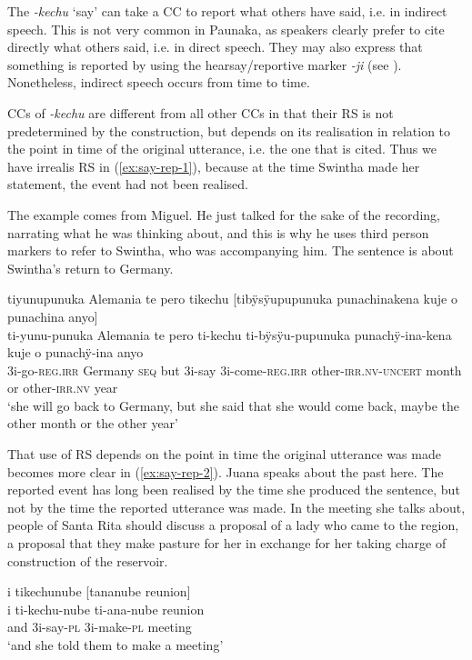 The  \textit{-kechu} ‘say’ can take a CC to report what others have said, i.e. in indirect speech. This is not very common in Paunaka, as speakers clearly prefer to cite directly what others said, i.e. in direct speech. They may also express that something is reported by using the hearsay/reportive marker \textit{-ji} (see ). Nonetheless, indirect speech occurs from time to time. 

CCs of \textit{-kechu} are different from all other CCs in that their RS is not predetermined by the construction, but depends on its realisation in relation to the point in time of the original utterance, i.e. the one that is cited. Thus we have irrealis RS in (\ref{ex:say-rep-1}), because at the time Swintha made her statement, the event had not been realised.

The example comes from Miguel. He just talked for the sake of the recording, narrating what he was thinking about, and this is why he uses third person markers to refer to Swintha, who was accompanying him. The sentence is about Swintha’s return to Germany.

\newpage
\ea\label{ex:say-rep-1}
\begingl
\glpreamble tiyunupunuka Alemania te pero tikechu \textup{[}tibÿsÿupupunuka punachinakena kuje o punachina anyo\textup{]}\\
\gla ti-yunu-punuka Alemania te pero ti-kechu ti-bÿsÿu-pupunuka punachÿ-ina-kena kuje o punachÿ-ina anyo\\
\glb 3i-go-\textsc{reg.irr} Germany \textsc{seq} but 3i-say 3i-come-\textsc{reg.irr} other-\textsc{irr.nv}-\textsc{uncert} month or other-\textsc{irr.nv} year\\
\glft ‘she will go back to Germany, but she said that she would come back, maybe the other month or the other year’
\endgl
\trailingcitation{[mxx-d110813s-2.049-050]}
\xe

That use of RS depends on the point in time the original utterance was made becomes more clear in (\ref{ex:say-rep-2}). Juana speaks about the past here. The reported event has long been realised by the time she produced the sentence, but not by the time the reported utterance was made. In the meeting she talks about, people of Santa Rita should discuss a proposal of a lady who came to the region, a proposal that they make pasture for her in exchange for her taking charge of construction of the reservoir.

\ea\label{ex:say-rep-2}
\begingl
\glpreamble i tikechunube \textup{[}tananube reunion\textup{]}\\
\gla i ti-kechu-nube ti-ana-nube reunion\\
\glb and 3i-say-\textsc{pl} 3i-make-\textsc{pl} meeting\\
\glft ‘and she told them to make a meeting’
\endgl
\trailingcitation{[jxx-p120515l-2.077]}
\xe

